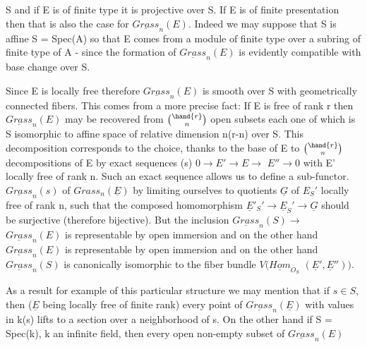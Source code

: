 
S and if E is of finite type it is projective over S.  If E is of
finite presentation then that is also the case for $\underline{Grass}_n(E)$.
Indeed we may suppose that S is affine S = Spec(A) so that E comes
from a module of finite type over a subring of finite type of A -
since the formation of $\underline{Grass}_n(E)$ is evidently compatible with base
change over S.

Since E is locally free therefore $\underline{Grass}_n(E)$ is smooth over S
with geometrically connected fibers.  This comes from a more
precise fact:  If E is free of rank r then $\underline{Grass}_n(E)$ may be
recovered from $\binom{\hand{r}}{n}$ open subsets each one of which is S isomorphic
to affine space of relative dimension n(r-n) over S.  This
decomposition corresponds to the choice, thanks to the base of E
to $\binom{\hand{r}}{n}$ decompositions of E by exact sequences (s) $0 \to E' \to E \to$
$E'' \to 0$ with E' locally free of rank n.  Such an exact sequence
allows us to define a sub-functor.  $\underline{Grass}_n(s)$ of $Grass_n(\underline{E})$ by
limiting ourselves to quotients $\underline{G}$ of $E_S{}'$ locally free of rank n,
such that the composed homomorphism $\underline{E}'_S{}' \to \underline{E}_S{}' \to \underline{G}$ should be
surjective (therefore bijective).  But the inclusion $\underline{Grass}_n(S) \to$
$\underline{Grass}_n(E)$ is representable by open immersion and on the other hand
$\underline{Grass}_n(E)$ is representable by open immersion and on the other hand
$\underline{Grass}_n(S)$ is canonically isomorphic to the fiber bundle $V(\underline{Hom}_{O_S}$
$(\underline{E}', \underline{E}''))$.

As a result for example of this particular structure we may
mention that if $s \in S$, then ($\underline{E}$ being locally free of finite rank)
every point of $\underline{Grass}_n(\underline{E})$ with values in k(s) lifts to a section
over a neighborhood of s.  On the other hand if S = Spec(k), k an
infinite field, then every open non-empty subset of $\underline{Grass}_n(E)$

